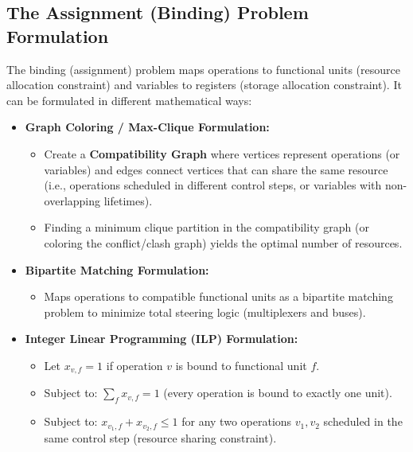 \documentclass[12pt,a4paper]{article}
\begin{document}
\subsection{The Assignment (Binding) Problem Formulation}
The binding (assignment) problem maps operations to functional units (resource allocation constraint) and variables to registers (storage allocation constraint). It can be formulated in different mathematical ways:
\begin{itemize}[leftmargin=*, itemsep=4pt]
  \item \textbf{Graph Coloring / Max-Clique Formulation:}
        \begin{itemize}[leftmargin=*, label=$\bullet$, itemsep=2pt]
          \item Create a \textbf{Compatibility Graph} where vertices represent operations (or variables) and edges connect vertices that can share the same resource (i.e., operations scheduled in different control steps, or variables with non-overlapping lifetimes).
          \item Finding a minimum clique partition in the compatibility graph (or coloring the conflict/clash graph) yields the optimal number of resources.
        \end{itemize}
  \item \textbf{Bipartite Matching Formulation:}
        \begin{itemize}[leftmargin=*, label=$\bullet$, itemsep=2pt]
          \item Maps operations to compatible functional units as a bipartite matching problem to minimize total steering logic (multiplexers and buses).
        \end{itemize}
  \item \textbf{Integer Linear Programming (ILP) Formulation:}
        \begin{itemize}[leftmargin=*, label=$\bullet$, itemsep=2pt]
          \item Let $x_{v,f} = 1$ if operation $v$ is bound to functional unit $f$.
          \item Subject to: $\sum_{f} x_{v,f} = 1$ (every operation is bound to exactly one unit).
          \item Subject to: $x_{v_1,f} + x_{v_2,f} \le 1$ for any two operations $v_1, v_2$ scheduled in the same control step (resource sharing constraint).
        \end{itemize}
\end{itemize}
\end{document}
